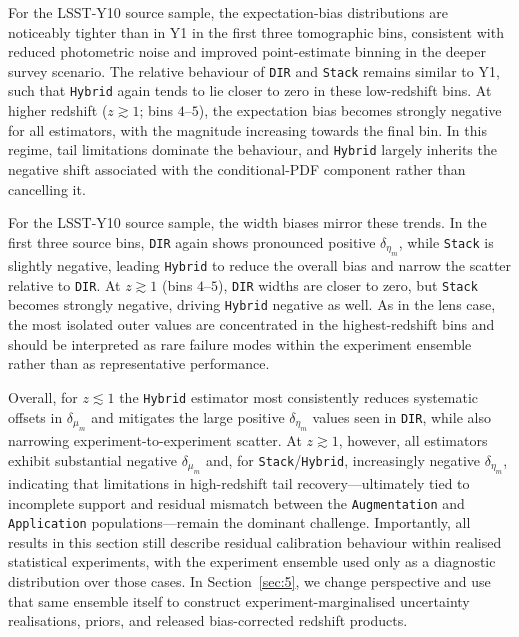 For the LSST-Y10 source sample, the expectation-bias distributions are noticeably tighter than in Y1 in the first three tomographic bins, consistent with reduced photometric noise and improved point-estimate binning in the deeper survey scenario. The relative behaviour of \texttt{DIR} and \texttt{Stack} remains similar to Y1, such that \texttt{Hybrid} again tends to lie closer to zero in these low-redshift bins. At higher redshift (\(z \gtrsim 1\); bins \(4\)--\(5\)), the expectation bias becomes strongly negative for all estimators, with the magnitude increasing towards the final bin. In this regime, tail limitations dominate the behaviour, and \texttt{Hybrid} largely inherits the negative shift associated with the conditional-PDF component rather than cancelling it.

For the LSST-Y10 source sample, the width biases mirror these trends. In the first three source bins, \texttt{DIR} again shows pronounced positive \(\delta_{\eta_m}\), while \texttt{Stack} is slightly negative, leading \texttt{Hybrid} to reduce the overall bias and narrow the scatter relative to \texttt{DIR}. At \(z \gtrsim 1\) (bins \(4\)--\(5\)), \texttt{DIR} widths are closer to zero, but \texttt{Stack} becomes strongly negative, driving \texttt{Hybrid} negative as well. As in the lens case, the most isolated outer values are concentrated in the highest-redshift bins and should be interpreted as rare failure modes within the experiment ensemble rather than as representative performance.

Overall, for \(z \lesssim 1\) the \texttt{Hybrid} estimator most consistently reduces systematic offsets in \(\delta_{\mu_m}\) and mitigates the large positive \(\delta_{\eta_m}\) values seen in \texttt{DIR}, while also narrowing experiment-to-experiment scatter. At \(z \gtrsim 1\), however, all estimators exhibit substantial negative \(\delta_{\mu_m}\) and, for \texttt{Stack}/\texttt{Hybrid}, increasingly negative \(\delta_{\eta_m}\), indicating that limitations in high-redshift tail recovery---ultimately tied to incomplete support and residual mismatch between the \texttt{Augmentation} and \texttt{Application} populations---remain the dominant challenge. Importantly, all results in this section still describe residual calibration behaviour within realised statistical experiments, with the experiment ensemble used only as a diagnostic distribution over those cases. In Section~\ref{sec:5}, we change perspective and use that same ensemble itself to construct experiment-marginalised uncertainty realisations, priors, and released bias-corrected redshift products.

